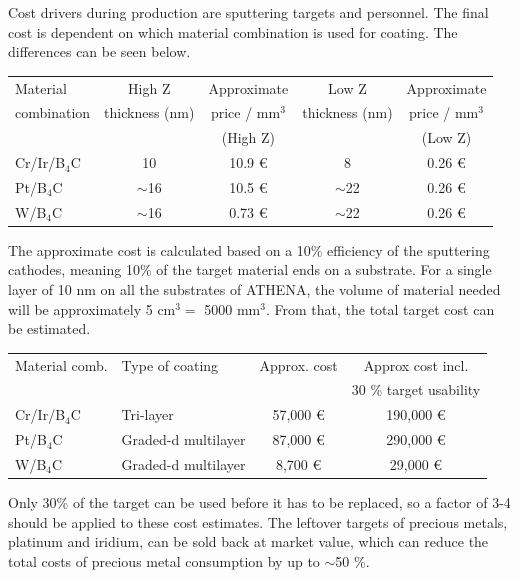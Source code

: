 Cost drivers during production are sputtering targets and personnel. The final cost is dependent on which material combination is used for coating. The differences can be seen below.

\begin{table}[htbp]
	\centering
\begin{tabular}{l|c|c|c|c}
Material 	& High Z 		& Approximate & Low Z  & Approximate \\
combination & thickness (nm) & price / mm$^3$ & thickness (nm) &  price / mm$^3$ \\
	&	& (High Z) &	& (Low Z) \\
\hline
\hline
Cr/Ir/B$_4$C & 10 & 10.9 \euro & 8 & 0.26 \euro\\
\hline
Pt/B$_4$C & $\sim$16 & 10.5 \euro & $\sim$22 & 0.26 \euro\\
\hline
W/B$_4$C & $\sim$16 & 0.73 \euro & $\sim$22 & 0.26 \euro\\
\end{tabular}
\end{table}

The approximate cost is calculated based on a 10\% efficiency of the sputtering cathodes, meaning 10\% of the target material ends on a substrate. For a single layer of 10 nm on all the substrates of ATHENA, the volume of material needed will be approximately 5 cm$^3 = $ 5000 mm$^3$. From that, the total target cost can be estimated.

\begin{table}[htbp]
	\centering
\begin{tabular}{l|l|c|c}
Material comb. 	& Type of coating & Approx. cost & Approx cost incl. \\
	&	&	&	30 \% target usability\\
\hline
\hline
Cr/Ir/B$_4$C & Tri-layer & 57,000 \euro & 190,000 \euro \\
\hline
Pt/B$_4$C & Graded-d multilayer & 87,000 \euro & 290,000 \euro\\
\hline
W/B$_4$C & Graded-d multilayer & 8,700 \euro & 29,000 \euro \\
\end{tabular}
\end{table}

Only 30\% of the target can be used before it has to be replaced, so a factor of 3-4 should be applied to these cost estimates. The leftover targets of precious metals, platinum and iridium, can be sold back at market value, which can reduce the total costs of precious metal consumption by up to $\sim$50 \%.

